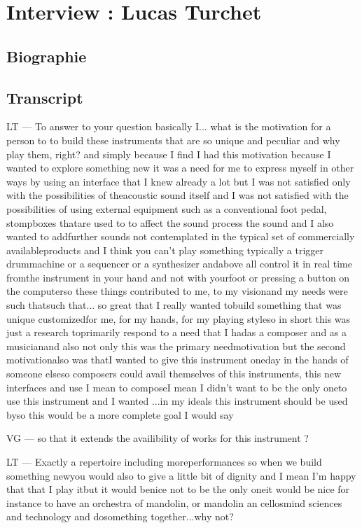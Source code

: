 \chapter{Interview : Lucas Turchet}
\label{appendix:turchet}

\section*{Biographie}

\section*{Transcript}

LT — To answer to your question basically I...  what is the motivation for a person to to build these instruments that are so unique and peculiar and why play them, right? and simply because I find I had this motivation because I wanted to explore something new it was a need for me to express myself in other ways by using an interface  that I knew already a lot but I was not satisfied only with the possibilities of theacoustic sound itself and I was not satisfied with the possibilities of using external equipment such as a conventional foot pedal, stompboxes thatare used to to affect the sound process the sound and I also wanted to addfurther sounds not contemplated in the typical set of commercially availableproducts and I think you can't play something typically a trigger drummachine or a sequencer or a synthesizer andabove all control it in real time fromthe instrument in your hand and not with yourfoot or pressing a button on the computerso these things contributed to me, to my visionand my needs were such thatsuch that... so great that I really wanted tobuild something that was unique customizedfor me, for my hands, for my playing styleso in short this was just a research toprimarily respond to a need that I hadas a composer and as a musicianand also not only this was the primary needmotivation but the second motivationalso was thatI wanted to give this instrument oneday in the hands of someone elseso composers could avail themselves of this instruments, this new interfaces and use I mean to composeI mean I didn't want to be the only oneto use this instrument and I wanted ...in my ideals this instrument should be used byso this would be a more complete goal I would say

VG — so that it extends the availibility of works for this instrument ?

LT — Exactly a repertoire including moreperformances so when we build something newyou would also to give a little bit of dignity and I mean I'm happy that that I play itbut it would benice not to be the only oneit would be nice for instance to have an orchestra of mandolin, or mandolin an cellosmind sciences and technology and dosomething together...why not?


